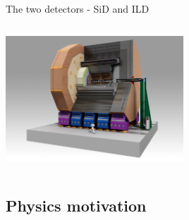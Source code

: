 \documentclass[xcolor={dvipsnames}]{beamer}
\begin{document}
\begin{frame}{The two detectors - SiD and ILD}
\begin{columns}
\begin{column}{0.48\textwidth}
\begin{center}
{\includegraphics[width=0.5\textwidth]{figures/ILDmodel.jpg}
}
\end{center}
\end{column}
\end{columns}

\end{frame}
\subsection{Physics motivation}
\end{document}
